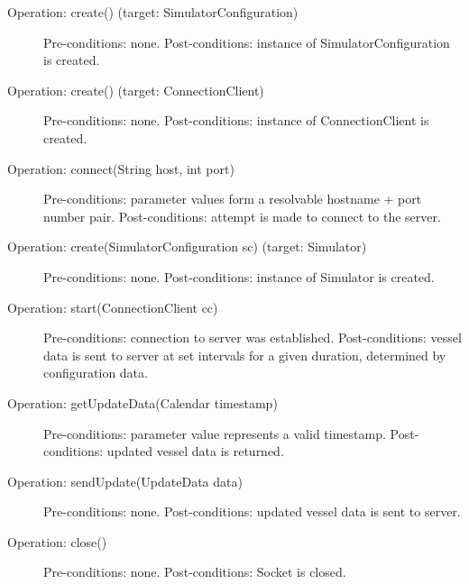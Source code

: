 \documentclass{article}
\begin{document}
\begin{description}
  \item[Operation: create() (target: SimulatorConfiguration)] Pre-conditions: none.\newline
  Post-conditions: instance of SimulatorConfiguration is created.
  \item[Operation: create() (target: ConnectionClient)] Pre-conditions: none.\newline
  Post-conditions: instance of ConnectionClient is created.
  \item[Operation: connect(String host, int port)] Pre-conditions: parameter values form a resolvable hostname + port number pair.\newline
  Post-conditions: attempt is made to connect to the server.
  \item[Operation: create(SimulatorConfiguration sc) (target: Simulator)] Pre-conditions: none.\newline
  Post-conditions: instance of Simulator is created.
  \item[Operation: start(ConnectionClient cc)] Pre-conditions: connection to server was established.\newline
  Post-conditions: vessel data is sent to server at set intervals for a given duration, determined by configuration data.
  \item[Operation: getUpdateData(Calendar timestamp)] Pre-conditions: parameter value represents a valid timestamp.\newline
  Post-conditions: updated vessel data is returned.
  \item[Operation: sendUpdate(UpdateData data)] Pre-conditions: none.\newline
  Post-conditions: updated vessel data is sent to server.
  \item[Operation: close()] Pre-conditions: none.\newline
  Post-conditions: Socket is closed.
\end{description}

\break
\end{document}
